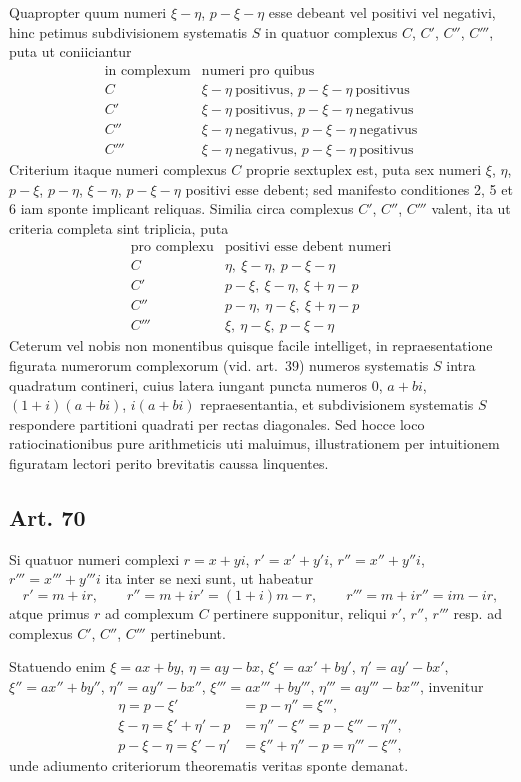 \documentclass[12pt]{article}
\newcommand{\art}[1]{\subsection*{Art. #1}}
\begin{document}
Quapropter quum numeri $\xi-\eta$, $p-\xi-\eta$ esse debeant vel positivi vel negativi, hinc petimus subdivisionem systematis $S$ in quatuor complexus $C$, $C'$, $C''$, $C'''$, puta ut coniiciantur
\[
\begin{array}{c|l}
\text{in complexum} & \text{numeri pro quibus}\\
\hline
C & \xi-\eta\ \text{positivus, } p-\xi-\eta\ \text{positivus}\\
C' & \xi-\eta\ \text{positivus, } p-\xi-\eta\ \text{negativus}\\
C'' & \xi-\eta\ \text{negativus, } p-\xi-\eta\ \text{negativus}\\
C''' & \xi-\eta\ \text{negativus, } p-\xi-\eta\ \text{positivus}
\end{array}
\]
Criterium itaque numeri complexus $C$ proprie sextuplex est, puta sex numeri $\xi$, $\eta$, $p-\xi$, $p-\eta$, $\xi-\eta$, $p-\xi-\eta$ positivi esse debent; sed manifesto conditiones 2, 5 et 6 iam sponte implicant reliquas. Similia circa complexus $C'$, $C''$, $C'''$ valent, ita ut criteria completa sint triplicia, puta
\[
\begin{array}{c|l}
\text{pro complexu} & \text{positivi esse debent numeri}\\
\hline
C & \eta,\ \xi-\eta,\ p-\xi-\eta\\
C' & p-\xi,\ \xi-\eta,\ \xi+\eta-p\\
C'' & p-\eta,\ \eta-\xi,\ \xi+\eta-p\\
C''' & \xi,\ \eta-\xi,\ p-\xi-\eta
\end{array}
\]
Ceterum vel nobis non monentibus quisque facile intelliget, in repraesentatione figurata numerorum complexorum (vid. art.~39) numeros systematis $S$ intra quadratum contineri, cuius latera iungant puncta numeros $0$, $a+bi$, $(1+i)(a+bi)$, $i(a+bi)$ repraesentantia, et subdivisionem systematis $S$ respondere partitioni quadrati per rectas diagonales. Sed hocce loco ratiocinationibus pure arithmeticis uti maluimus, illustrationem per intuitionem figuratam lectori perito brevitatis caussa linquentes.

\art{70}
Si quatuor numeri complexi $r=x+yi$, $r'=x'+y'i$, $r''=x''+y''i$, $r'''=x'''+y'''i$ ita inter se nexi sunt, ut habeatur
\[
r'=m+ir,\qquad r''=m+ir'=(1+i)m-r,\qquad
r'''=m+ir''=im-ir,
\]
atque primus $r$ ad complexum $C$ pertinere supponitur, reliqui $r'$, $r''$, $r'''$ resp. ad complexus $C'$, $C''$, $C'''$ pertinebunt.

Statuendo enim $\xi=ax+by$, $\eta=ay-bx$, $\xi'=ax'+by'$, $\eta'=ay'-bx'$, $\xi''=ax''+by''$, $\eta''=ay''-bx''$, $\xi'''=ax'''+by'''$, $\eta'''=ay'''-bx'''$, invenitur
\[
\begin{aligned}
\eta=p-\xi'&=p-\eta''=\xi''',\\
\xi-\eta=\xi'+\eta'-p&=\eta''-\xi''=p-\xi'''-\eta''',\\
p-\xi-\eta=\xi'-\eta'&=\xi''+\eta''-p=\eta'''-\xi''' ,
\end{aligned}
\]
unde adiumento criteriorum theorematis veritas sponte demanat.
\end{document}
